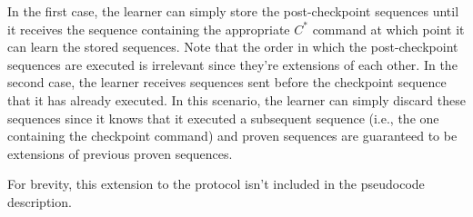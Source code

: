 In the first case, the learner can simply store the post-checkpoint sequences until it receives the sequence containing the appropriate $C^*$ command at which point it can learn the stored sequences. Note that the order in which the post-checkpoint sequences are executed is irrelevant since they're extensions of each other. In the second case, the learner receives sequences sent before the checkpoint sequence that it has already executed. In this scenario, the learner can simply discard these sequences since it knows that it executed a subsequent sequence (i.e., the one containing the checkpoint command) and proven sequences are guaranteed to be extensions of previous proven sequences. \par
For brevity, this extension to the protocol isn't included in the pseudocode description.